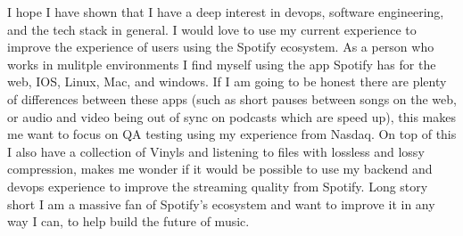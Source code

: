 \documentclass[../../main.tex]{subfiles}
\begin{document}
I hope I have shown that I have a deep interest in devops, software engineering, and the tech stack in general. I would love to use my current experience to improve the experience of users using the Spotify ecosystem. As a person who works in mulitple environments I find myself using the app Spotify has for the web, IOS, Linux, Mac, and windows. If I am going to be honest there are plenty of differences between these apps (such as short pauses between songs on the web, or audio and video being out of sync on podcasts which are speed up), this makes me want to focus on QA testing using my experience from Nasdaq. On top of this I also have a collection of Vinyls and listening to files with lossless and lossy compression, makes me wonder if it would be possible to use my backend and devops experience to improve the streaming quality from Spotify. Long story short I am a massive fan of Spotify's ecosystem and want to improve it in any way I can, to help build the future of music.
\\
\end{document}
